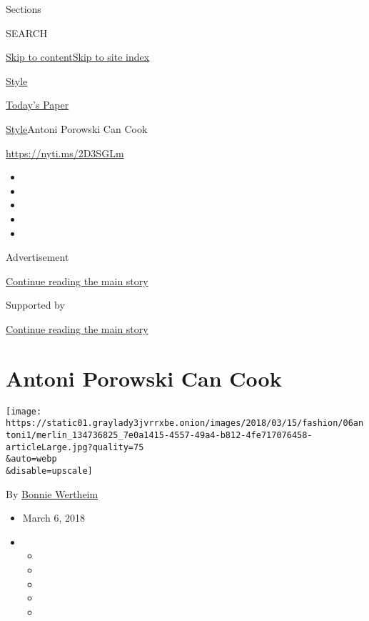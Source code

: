Sections

SEARCH

\protect\hyperlink{site-content}{Skip to
content}\protect\hyperlink{site-index}{Skip to site index}

\href{https://www.nytimes3xbfgragh.onion/section/style}{Style}

\href{https://myaccount.nytimes3xbfgragh.onion/auth/login?response_type=cookie\&client_id=vi}{}

\href{https://www.nytimes3xbfgragh.onion/section/todayspaper}{Today's
Paper}

\href{/section/style}{Style}\textbar{}Antoni Porowski Can Cook

\url{https://nyti.ms/2D3SGLm}

\begin{itemize}
\item
\item
\item
\item
\item
\end{itemize}

Advertisement

\protect\hyperlink{after-top}{Continue reading the main story}

Supported by

\protect\hyperlink{after-sponsor}{Continue reading the main story}

\hypertarget{antoni-porowski-can-cook}{%
\section{Antoni Porowski Can Cook}\label{antoni-porowski-can-cook}}

\texttt{[image: https://static01.graylady3jvrrxbe.onion/images/2018/03/15/fashion/06antoni1/merlin\_134736825\_7e0a1415-4557-49a4-b812-4fe717076458-articleLarge.jpg?quality=75\\\&auto=webp\\\&disable=upscale]}

By \href{https://www.nytimes3xbfgragh.onion/by/bonnie-wertheim}{Bonnie
Wertheim}

\begin{itemize}
\item
  March 6, 2018
\item
  \begin{itemize}
  \item
  \item
  \item
  \item
  \item
  \end{itemize}
\end{itemize}

